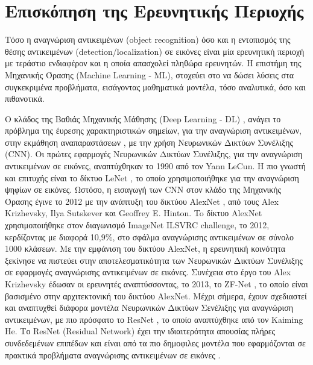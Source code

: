 \chapter{Επισκόπηση της Ερευνητικής Περιοχής}
\label{chapter:sota}
Τόσο η αναγνώριση αντικειμένων (object recognition) όσο και η εντοπισμός
της θέσης αντικειμένων (detection/localization) σε εικόνες
είναι μία ερευνητική περιοχή με τεράστιο ενδιαφέρον και
η οποία απασχολεί πληθώρα ερευνητών. Η επιστήμη της Μηχανικής Όρασης (Machine Learning - ML),
στοχεύει στο να δώσει λύσεις στα συγκεκριμένα προβλήματα, εισάγοντας μαθηματικά
μοντέλα, τόσο αναλυτικά, όσο και πιθανοτικά.

O κλάδος της Βαθιάς Μηχανικής Mάθησης (Deep Learning - DL) \cite{Goodfellow-et-al-2016-Book},
ανάγει το πρόβλημα της έυρεσης χαρακτηριστικών σημείων, για την αναγνώριση αντικειμένων,
στην εκμάθηση αναπαραστάσεων \cite{bengio2013representation}, με την χρήση Νευρωνικών Δικτύων Συνέλιξης (CNN).
Οι πρώτες εφαρμογές Νευρωνικών Δικτύων Συνέλιξης, για την αναγνώριση αντικειμένων
σε εικόνες, αναπτύχθηκαν το 1990 από τον Yann LeCun.
Η πιο γνωστή και επιτυχής είναι το δίκτυο LeNet \cite{lecun1998gradient}, το οποίο
χρησιμοποιήθηκε για την αναγνώριση ψηφίων σε εικόνες.
Ωστόσο, η εισαγωγή των CNN στον κλάδο της Μηχανικής Όρασης έγινε το 2012 με
την ανάπτυξη του δικτύου AlexNet \cite{NIPS2012_4824}, από τους Alex Krizhevsky,
Ilya Sutskever και Geoffrey E. Hinton. To δίκτυο AlexNet χρησιμοποιήθηκε
στον διαγωνισμό ImageNet ILSVRC challenge, το 2012, κερδίζοντας με διαφορά
10,9\%, στο σφάλμα αναγνώρισης αντικειμένων σε σύνολο 1000 κλάσεων.
Με την εμφάνιση του δικτύου AlexNet, η ερευνητική κοινότητα ξεκίνησε να
πιστεύει στην αποτελεσματικότητα των Νευρωνικών Δικτύων Συνέλιξης σε εφαρμογές αναγνώρισης
αντικειμένων σε εικόνες. Συνέχεια στο έργο του Alex Krizhevsky έδωσαν οι
ερευνητές αναπτύσσοντας, το 2013, το ZF-Net \cite{DBLP:journals/corr/ZeilerF13}, το οποίο είναι
βασισμένο στην αρχιτεκτονική του δικτύου AlexNet. Μέχρι σήμερα, έχουν σχεδιαστεί
και αναπτυχθεί διάφορα μοντέλα Νευρωνικών Δικτύων Σενέλιξης για
αναγνώριση αντικειμένων, με πιο πρόσφατο το ResNet \cite{DBLP:journals/corr/HeZRS15},
το οποίο αναπτύχθηκε από τον Kaiming He. Το ResNet (Residual Network) έχει την
ιδιαιτερότητα απουσίας πλήρες συνδεδεμένων επιπέδων και είναι από τα πιο δημοφιλες
μοντέλα που εφαρμόζονται σε πρακτικά προβλήματα αναγνώρισης αντικειμένων σε
εικόνες \cite{DBLP:journals/corr/HeZR016}.

